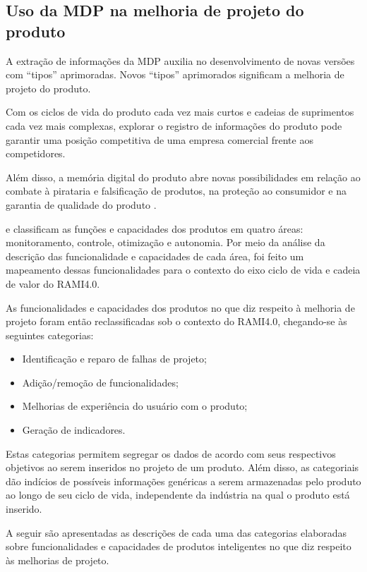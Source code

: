\subsection{Uso da MDP na melhoria de projeto do produto}
\label{sec:melhoria-projeto}

A extração de informações da MDP auxilia no desenvolvimento de novas versões com ``tipos'' aprimoradas. Novos ``tipos'' aprimorados significam a melhoria de projeto do produto.

Com os ciclos de vida do produto cada vez mais curtos e cadeias de suprimentos cada vez mais complexas, explorar o registro de informações do produto pode garantir uma posição competitiva de uma empresa comercial frente aos competidores.

Além disso, a memória digital do produto abre novas possibilidades em relação ao combate à pirataria e falsificação de produtos, na proteção ao consumidor e na garantia de qualidade do produto \cite{wahlster2007digitalmemory}.

 e  classificam as funções e capacidades dos produtos em quatro áreas: monitoramento, controle, otimização e autonomia. Por meio da análise da descrição das funcionalidade e capacidades de cada área, foi feito um mapeamento dessas funcionalidades para o contexto do eixo ciclo de vida e cadeia de valor do RAMI4.0.

As funcionalidades e capacidades dos produtos no que diz respeito à melhoria de projeto foram então reclassificadas sob o contexto do RAMI4.0, chegando-se às seguintes categorias:

\begin{itemize}
	\item Identificação e reparo de falhas de projeto;
	\item Adição/remoção de funcionalidades;
	\item Melhorias de experiência do usuário com o produto;
	\item Geração de indicadores.
\end{itemize}

Estas categorias permitem segregar os dados de acordo com seus respectivos objetivos ao serem inseridos no projeto de um produto. Além disso, as categoriais dão indícios de possíveis informações genéricas a serem armazenadas pelo produto ao longo de seu ciclo de vida, independente da indústria na qual o produto está inserido.

A seguir são apresentadas as descrições de cada uma das categorias elaboradas sobre funcionalidades e capacidades de produtos inteligentes no que diz respeito às melhorias de projeto.

